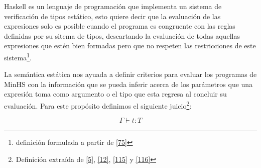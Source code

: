    \textsf{Haskell} es un lenguaje de programación que implementa un sistema de verificación de tipos estático, esto quiere decir que la evaluación de las expresiones solo es posible cuando el programa es congruente con las reglas definidas por su sitema de tipos, descartando la evaluación de todas aquellas expresiones que estén bien formadas pero que no respeten las restricciones de este sistema\footnote{definición formulada a partir de \hyperlink{75}{[75]}}. 


    \begin{definition}
       La semántica estática nos ayuada a definir criterios para evaluar los programas de \textsf{MinHS} con la información que se pueda inferir acerca de los parámetros que una expresión toma como argumento o el tipo que esta regresa al concluir su evaluación. Para este propósito definimos el siguiente juicio\footnote{Definición extraída de  \hyperlink{5}{[5]},  \hyperlink{12}{[12]}, \hyperlink{115}{[115]} y \hyperlink{116}{[116]}}:
    
    $$\Gamma\vdash t: T$$
    

\end{definition}
